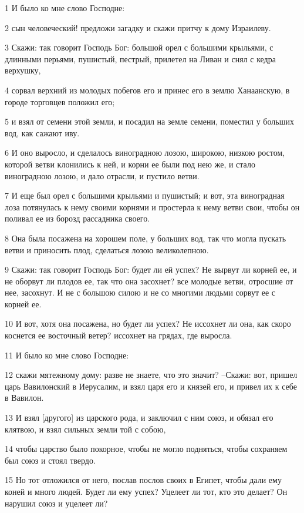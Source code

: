 \par 1 И было ко мне слово Господне:
\par 2 сын человеческий! предложи загадку и скажи притчу к дому Израилеву.
\par 3 Скажи: так говорит Господь Бог: большой орел с большими крыльями, с длинными перьями, пушистый, пестрый, прилетел на Ливан и снял с кедра верхушку,
\par 4 сорвал верхний из молодых побегов его и принес его в землю Ханаанскую, в городе торговцев положил его;
\par 5 и взял от семени этой земли, и посадил на земле семени, поместил у больших вод, как сажают иву.
\par 6 И оно выросло, и сделалось виноградною лозою, широкою, низкою ростом, которой ветви клонились к ней, и корни ее были под нею же, и стало виноградною лозою, и дало отрасли, и пустило ветви.
\par 7 И еще был орел с большими крыльями и пушистый; и вот, эта виноградная лоза потянулась к нему своими корнями и простерла к нему ветви свои, чтобы он поливал ее из борозд рассадника своего.
\par 8 Она была посажена на хорошем поле, у больших вод, так что могла пускать ветви и приносить плод, сделаться лозою великолепною.
\par 9 Скажи: так говорит Господь Бог: будет ли ей успех? Не вырвут ли корней ее, и не оборвут ли плодов ее, так что она засохнет? все молодые ветви, отросшие от нее, засохнут. И не с большою силою и не со многими людьми сорвут ее с корней ее.
\par 10 И вот, хотя она посажена, но будет ли успех? Не иссохнет ли она, как скоро коснется ее восточный ветер? иссохнет на грядах, где выросла.
\par 11 И было ко мне слово Господне:
\par 12 скажи мятежному дому: разве не знаете, что это значит? --Скажи: вот, пришел царь Вавилонский в Иерусалим, и взял царя его и князей его, и привел их к себе в Вавилон.
\par 13 И взял [другого] из царского рода, и заключил с ним союз, и обязал его клятвою, и взял сильных земли той с собою,
\par 14 чтобы царство было покорное, чтобы не могло подняться, чтобы сохраняем был союз и стоял твердо.
\par 15 Но тот отложился от него, послав послов своих в Египет, чтобы дали ему коней и много людей. Будет ли ему успех? Уцелеет ли тот, кто это делает? Он нарушил союз и уцелеет ли?

